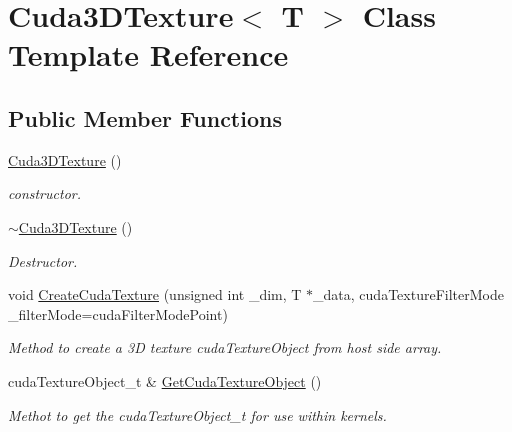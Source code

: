 \hypertarget{classCuda3DTexture}{}\section{Cuda3\+D\+Texture$<$ T $>$ Class Template Reference}
\label{classCuda3DTexture}
\subsection*{Public Member Functions}
\begin{DoxyCompactItemize}
\item 
\hyperlink{classCuda3DTexture_a97ca5db23751d3af34e03653da4e876f}{Cuda3\+D\+Texture} ()\hypertarget{classCuda3DTexture_a97ca5db23751d3af34e03653da4e876f}{}\label{classCuda3DTexture_a97ca5db23751d3af34e03653da4e876f}

\begin{DoxyCompactList}\small\item\em constructor. \end{DoxyCompactList}\item 
\hyperlink{classCuda3DTexture_acb0c8101772d4774efd285c4fa65b6a3}{$\sim$\+Cuda3\+D\+Texture} ()\hypertarget{classCuda3DTexture_acb0c8101772d4774efd285c4fa65b6a3}{}\label{classCuda3DTexture_acb0c8101772d4774efd285c4fa65b6a3}

\begin{DoxyCompactList}\small\item\em Destructor. \end{DoxyCompactList}\item 
void \hyperlink{classCuda3DTexture_a64ca3ec105c67b2823258d00bdc548cc}{Create\+Cuda\+Texture} (unsigned int \+\_\+dim, T $\ast$\+\_\+data, cuda\+Texture\+Filter\+Mode \+\_\+filter\+Mode=cuda\+Filter\+Mode\+Point)
\begin{DoxyCompactList}\small\item\em Method to create a 3D texture cuda\+Texture\+Object from host side array. \end{DoxyCompactList}\item 
cuda\+Texture\+Object\+\_\+t \& \hyperlink{classCuda3DTexture_a58992e7abc5d4bfe139be329ecc37b83}{Get\+Cuda\+Texture\+Object} ()
\begin{DoxyCompactList}\small\item\em Methot to get the cuda\+Texture\+Object\+\_\+t for use within kernels. \end{DoxyCompactList}\end{DoxyCompactItemize}


